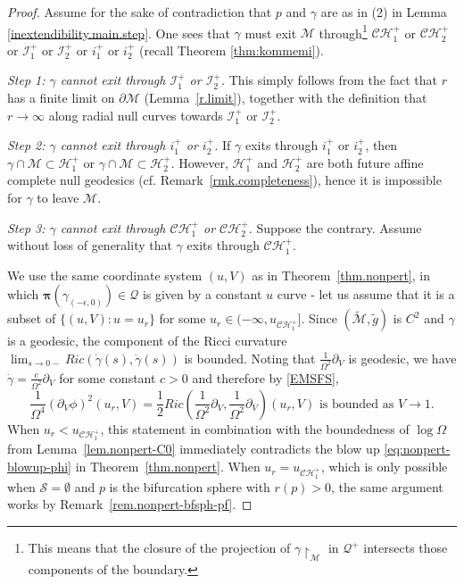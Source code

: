 \documentclass[10pt, reqno]{amsart}
\theoremstyle{definition}
\theoremstyle{remark}
\numberwithin{equation}{section}
\newcommand{\rd}{\partial}
\newcommand{\0}{\emptyset}
\newcommand{\Omg}{\Omega}
\newcommand{\calC}{\mathcal C}
\newcommand{\calH}{\mathcal H}
\newcommand{\calS}{\mathcal S}
\newcommand{\f}{\frac}
\newcommand{\CH}{\calC \calH^{+}}		%
\newcommand{\EH}{\calH^{+}}
\newcommand{\pfstep}[1]{\vspace{.5em} {\it \noindent #1.}}
\begin{document}
\begin{proof}
Assume for the sake of contradiction that $p$ and $\gamma$ are as in (2) in Lemma \ref{inextendibility.main.step}. One sees that $\gamma$ must exit $\mathcal M$ through\footnote{This means that the closure of the projection of $\gamma\restriction_{\mathcal M}$ in $\mathcal Q^+$ intersects those components of the boundary.} $\mathcal C\mathcal H^+_1$ or $\mathcal C\mathcal H^+_2$ or $\mathcal I^+_1$ or $\mathcal I^+_2$ or $i^+_1$ or $i^+_2$ (recall Theorem \ref{thm:kommemi}). 

\pfstep{Step 1: $\gamma$ cannot exit through $\mathcal I^+_1$ or $\mathcal I^+_2$} This simply follows from the fact that $r$ has a finite limit on $\rd \mathcal M$ (Lemma~\ref{r.limit}), together with the definition that $r\to \infty$ along radial null curves towards $\mathcal I^+_1$ or $\mathcal I^+_2$.

\pfstep{Step 2: $\gamma$ cannot exit through $i^+_1$ or $i^+_2$} If $\gamma$ exits through $i^+_1$ or $i^+_2$, then $\gamma\cap \mathcal M\subset \EH_1$ or $\gamma\cap \mathcal M\subset \EH_2$. However, $\EH_1$ and $\EH_2$ are both future affine complete null geodesics (cf. Remark~\ref{rmk.completeness}), hence it is impossible for $\gamma$ to leave $\mathcal M$.

\pfstep{Step 3: $\gamma$ cannot exit through $\mathcal C\mathcal H^+_1$ or $\mathcal C\mathcal H^+_2$} 
Suppose the contrary. Assume without loss of generality that $\gamma$ exits through $\mathcal C\mathcal H^+_1$. 

We use the same coordinate system $(u, V)$ as in Theorem~\ref{thm.nonpert}, in which ${\boldsymbol \pi}(\gamma_{(-\epsilon,0)})\in \mathcal Q$ is given by a constant $u$ curve - let us assume that it is a subset of $\{(u,V):u=u_r\}$ for some $u_r\in (-\infty, u_{\CH_{1}}]$. Since $(\widetilde{\mathcal M},\tilde{g})$ is $C^2$ and $\gamma$ is a geodesic, the component of the Ricci curvature $\lim_{s\to 0-} Ric(\dot\gamma(s),\dot\gamma(s))$ is bounded. Noting that $\f{1}{\Omg^2}\rd_V$ is geodesic, we have $\dot\gamma= \f{c}{\Omg^2}\rd_V$ for some constant $c>0$ and therefore by \eqref{EMSFS},
\begin{equation}\label{geod.bdd}
\f{1}{\Omg^4}(\rd_V\phi)^2(u_r,V)=\f 12 Ric \left( \f{1}{\Omg^2}\rd_V,\f{1}{\Omg^2}\rd_V \right)(u_r, V)\mbox{ is bounded as } V \to 1.
\end{equation}
When $u_{r} < u_{\CH_{1}}$, this statement in combination with the boundedness of $\log \Omg$ from Lemma~\ref{lem.nonpert-C0} immediately contradicts the blow up \eqref{eq:nonpert-blowup-phi} in Theorem~\ref{thm.nonpert}. When $u_{r} = u_{\CH_{1}}$, which is only possible when $\calS = \emptyset$ and $p$ is the bifurcation sphere with $r(p) > 0$, the same argument works by Remark~\ref{rem.nonpert-bfsph-pf}. \qedhere
\end{proof}
\end{document}
